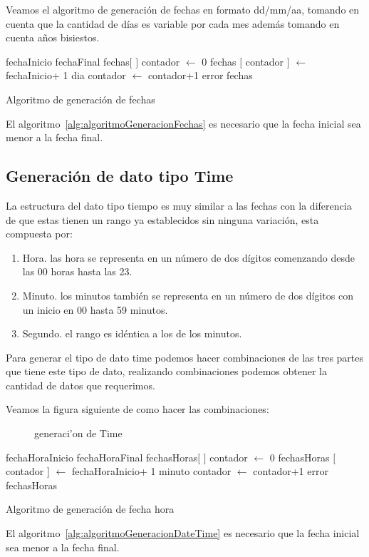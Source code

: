Veamos el algoritmo de generaci\'on de fechas en formato dd/mm/aa, tomando en cuenta que la cantidad de d\'ias es variable por cada mes adem\'as tomando en cuenta a\~nos bisiestos.
\begin{algorithm}[H]
\begin{algorithmic}[1]
\REQUIRE fechaInicio fechaFinal
\STATE fechas$[$ $]$
\STATE contador $\leftarrow$ 0
	\STATE fechas $[$ contador $]$ $\leftarrow$ fechaInicio+ 1 dia
	\STATE contador $\leftarrow$ contador+1
	\ENDWHILE
\ELSE
	\RETURN error
\ENDIF
\RETURN fechas
\end{algorithmic}
\caption{Algoritmo de generaci\'on de fechas}\label{alg:algoritmoGeneracionFechas}
\end{algorithm}
El algoritmo~\ref{alg:algoritmoGeneracionFechas} es necesario que la fecha inicial sea menor a la fecha final.

\subsection{Generaci\'on de dato tipo Time}
La estructura del dato tipo tiempo es muy similar a las fechas con la diferencia de que estas tienen un rango ya establecidos sin ninguna variaci\'on, esta compuesta por:
\begin{enumerate}
\item Hora. las hora se representa en un n\'umero de dos d\'igitos comenzando desde las 00 horas hasta las 23.
\item Minuto. los minutos tambi\'en se representa en un n\'umero de dos d\'igitos con un inicio en 00 hasta 59 minutos.
\item Segundo. el rango es id\'entica a los de los minutos.
\end{enumerate}
Para generar el tipo de dato time podemos hacer combinaciones de las tres partes que tiene este tipo de dato, realizando combinaciones podemos obtener la cantidad de datos que requerimos.

Veamos la figura siguiente de como hacer las combinaciones:

\begin{figure}[H]
\centering
{}
\caption{generaci'on de Time} \label{fig:generacion de Time}
\end{figure}
\begin{algorithm}[H]
\begin{algorithmic}[1]
\REQUIRE fechaHoraInicio fechaHoraFinal
\STATE fechasHoras$[$ $]$
\STATE contador $\leftarrow$ 0
	\STATE fechasHoras $[$ contador $]$ $\leftarrow$ fechaHoraInicio+ 1 minuto
	\STATE contador $\leftarrow$ contador+1
	\ENDWHILE
\ELSE
	\RETURN error
\ENDIF
\RETURN fechasHoras
\end{algorithmic}
\caption{Algoritmo de generaci\'on de fecha hora}\label{alg:algoritmoGeneracionDateTime}
\end{algorithm}
El algoritmo~\ref{alg:algoritmoGeneracionDateTime} es necesario que la fecha inicial sea menor a la fecha final.\\
